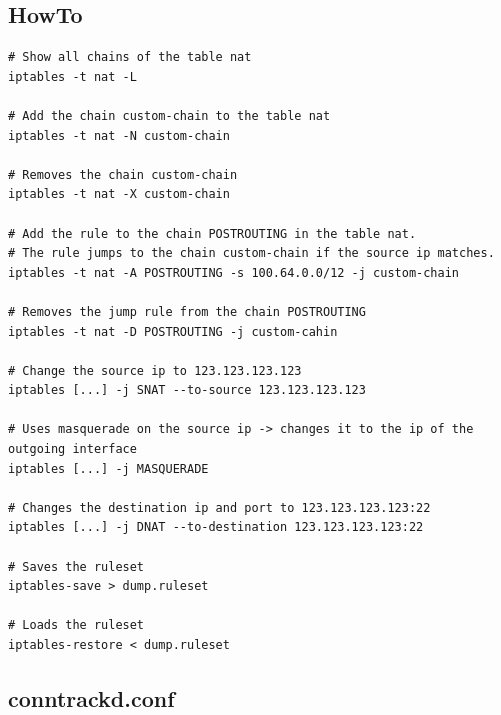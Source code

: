 \documentclass{report}
\begin{document}
\subsection{HowTo}

\begin{verbatim}
# Show all chains of the table nat
iptables -t nat -L

# Add the chain custom-chain to the table nat
iptables -t nat -N custom-chain

# Removes the chain custom-chain
iptables -t nat -X custom-chain

# Add the rule to the chain POSTROUTING in the table nat.
# The rule jumps to the chain custom-chain if the source ip matches.
iptables -t nat -A POSTROUTING -s 100.64.0.0/12 -j custom-chain

# Removes the jump rule from the chain POSTROUTING
iptables -t nat -D POSTROUTING -j custom-cahin

# Change the source ip to 123.123.123.123
iptables [...] -j SNAT --to-source 123.123.123.123

# Uses masquerade on the source ip -> changes it to the ip of the outgoing interface
iptables [...] -j MASQUERADE

# Changes the destination ip and port to 123.123.123.123:22
iptables [...] -j DNAT --to-destination 123.123.123.123:22

# Saves the ruleset
iptables-save > dump.ruleset

# Loads the ruleset
iptables-restore < dump.ruleset
\end{verbatim}

\subsection{conntrackd.conf}\label{conntrackd.conf}
\end{document}
